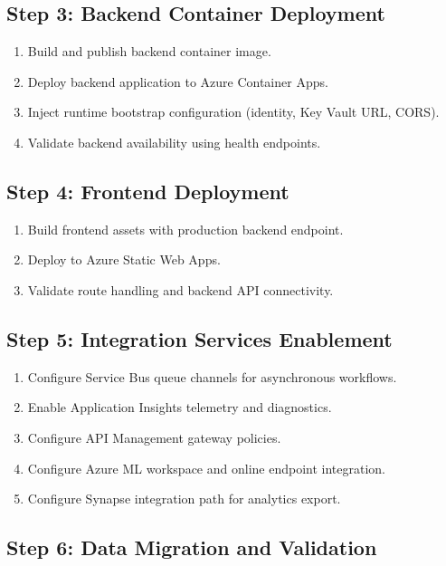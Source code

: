 \documentclass[12pt,a4paper]{article}
\begin{document}
\subsection{Step 3: Backend Container Deployment}

\begin{enumerate}[leftmargin=1.4em]
  \item Build and publish backend container image.
  \item Deploy backend application to Azure Container Apps.
  \item Inject runtime bootstrap configuration (identity, Key Vault URL, CORS).
  \item Validate backend availability using health endpoints.
\end{enumerate}

\subsection{Step 4: Frontend Deployment}

\begin{enumerate}[leftmargin=1.4em]
  \item Build frontend assets with production backend endpoint.
  \item Deploy to Azure Static Web Apps.
  \item Validate route handling and backend API connectivity.
\end{enumerate}

\subsection{Step 5: Integration Services Enablement}

\begin{enumerate}[leftmargin=1.4em]
  \item Configure Service Bus queue channels for asynchronous workflows.
  \item Enable Application Insights telemetry and diagnostics.
  \item Configure API Management gateway policies.
  \item Configure Azure ML workspace and online endpoint integration.
  \item Configure Synapse integration path for analytics export.
\end{enumerate}

\subsection{Step 6: Data Migration and Validation}
\end{document}
